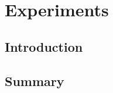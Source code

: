 
\chapter{Experiments} \label{chap:experimental_result}
    \section{Introduction}
    
    
    
    
    \section{Summary}
